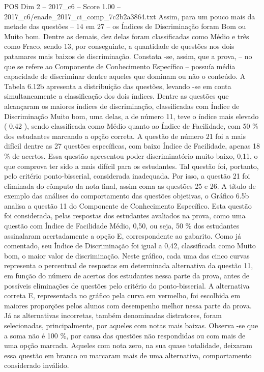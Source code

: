 \begin{textsample}{POS Dim 2 – 2017\_c6 – Score 1.00 – 2017\_c6/enade\_2017\_ci\_comp\_7c2b2a3864.txt}
Assim, para um pouco mais da metade das questões – 14 em 27 – os Índices de Discriminação foram Bom ou Muito bom.
Dentre as demais, dez delas foram classificadas como Médio e três como Fraco, sendo 13, por conseguinte, a quantidade de questões nos dois patamares mais baixos de discriminação.
Constata -se, assim, que a prova, – no que se refere ao Componente de Conhecimento Específico – possuía média capacidade de discriminar dentre aqueles que dominam ou não o conteúdo.
A Tabela 6.12b apresenta a distribuição das questões, levando -se em conta simultaneamente a classificação dos dois índices.
Dentre as questões que alcançaram os maiores índices de discriminação, classificadas com Índice de Discriminação Muito bom, uma delas, a de número 11, teve o índice mais elevado ( 0,42 ), sendo classificada como Médio quanto ao Índice de Facilidade, com 50 \% dos estudantes marcando a opção correta.
A questão de número 21 foi a mais difícil dentre as 27 questões específicas, com baixo Índice de Facilidade, apenas 18 \% de acertos.
Essa questão apresentou poder discriminatório muito baixo, 0,11, o que comprova ter sido a mais difícil para os estudantes.
Tal questão foi, portanto, pelo critério ponto-bisserial, considerada inadequada.
Por isso, a questão 21 foi eliminada do cômputo da nota final, assim coma as questões 25 e 26.
A título de exemplo das análises do comportamento das questões objetivas, o Gráfico 6.5b analisa a questão 11 do Componente de Conhecimento Específico.
Esta questão foi considerada, pelas respostas dos estudantes avaliados na prova, como uma questão com Índice de Facilidade Médio, 0,50, ou seja, 50 \% dos estudantes assinalaram acertadamente a opção E, correspondente ao gabarito.
Como já comentado, seu Índice de Discriminação foi igual a 0,42, classificada como Muito bom, o maior valor de discriminação.
Neste gráfico, cada uma das cinco curvas representa o percentual de respostas em determinada alternativa da questão 11, em função do número de acertos dos estudantes nessa parte da prova, antes de possíveis eliminações de questões pelo critério do ponto-bisserial.
A alternativa correta E, representada no gráfico pela curva em vermelho, foi escolhida em maiores proporções pelos alunos com desempenho melhor nessa parte da prova.
Já as alternativas incorretas, também denominadas distratores, foram selecionadas, principalmente, por aqueles com notas mais baixas.
Observa -se que a soma não é 100 \%, por causa das questões não respondidas ou com mais de uma opção marcada.
Aqueles com nota zero, na sua quase totalidade, deixaram essa questão em branco ou marcaram mais de uma alternativa, comportamento considerado inválido.

\end{textsample}
